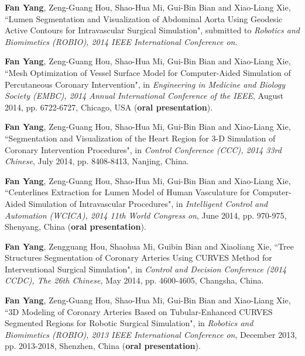 
\begin{publications}{99}

\item \textbf{Fan Yang}, Zeng-Guang Hou, Shao-Hua Mi, Gui-Bin Bian and Xiao-Liang Xie, ``Lumen Segmentation and Visualization of Abdominal Aorta Using Geodesic Active Contours for Intravascular Surgical Simulation", submitted to \textit{Robotics and Biomimetics (ROBIO), 2014 IEEE International Conference on}.%

\item \textbf{Fan Yang}, Zeng-Guang Hou, Shao-Hua Mi, Gui-Bin Bian and Xiao-Liang Xie, ``Mesh Optimization of Vessel Surface Model for Computer-Aided Simulation of Percutaneous Coronary Intervention", in \textit{Engineering in Medicine and Biology Society (EMBC), 2014 Annual International Conference of the IEEE}, August 2014, pp. 6722-6727, Chicago, USA (\textbf{oral presentation}).%

\item \textbf{Fan Yang}, Zeng-Guang Hou, Shao-Hua Mi, Gui-Bin Bian and Xiao-Liang Xie, ``Segmentation and Visualization of the Heart Region for 3-D Simulation of Coronary Intervention Procedures", in \textit{Control Conference (CCC), 2014 33rd Chinese}, July 2014, pp. 8408-8413, Nanjing, China.%

\item \textbf{Fan Yang}, Zeng-Guang Hou, Shao-Hua Mi, Gui-Bin Bian and Xiao-Liang Xie, ``Centerlines Extraction for Lumen Model of Human Vasculature for Computer-Aided Simulation of Intravascular Procedures", in \textit{Intelligent Control and Automation (WCICA), 2014 11th World Congress on}, June 2014, pp. 970-975, Shenyang, China (\textbf{oral presentation}).%

\item \textbf{Fan Yang}, Zengguang Hou, Shaohua Mi, Guibin Bian and Xiaoliang Xie, ``Tree Structures Segmentation of Coronary Arteries Using CURVES Method for Interventional Surgical Simulation", in \textit{Control and Decision Conference (2014 CCDC), The 26th Chinese}, May 2014, pp. 4600-4605, Changsha, China.%

\item \textbf{Fan Yang}, Zeng-Guang Hou, Shao-Hua Mi, Gui-Bin Bian and Xiao-Liang Xie, ``3D Modeling of Coronary Arteries Based on Tubular-Enhanced CURVES Segmented Regions for Robotic Surgical Simulation", in \textit{Robotics and Biomimetics (ROBIO), 2013 IEEE International Conference on}, December 2013, pp. 2013-2018, Shenzhen, China (\textbf{oral presentation}).%


\end{publications}
